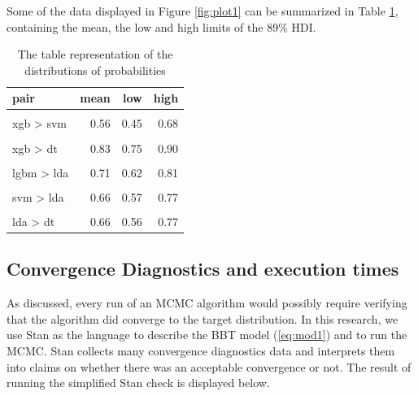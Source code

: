 \documentclass[twoside,11pt,preprint]{article}
\begin{document}
Some of the data displayed in Figure \ref{fig:plot1} can be summarized in Table \ref{tab:main1}, containing the mean, the low and high limits of the 89\% HDI.

\begin{table}

\caption{\label{tab:xresume1}\label{tab:main1}The table representation of the distributions of probabilities}
\centering
\begin{tabular}[t]{lrrr}
\toprule
\textbf{pair} & \textbf{mean} & \textbf{low} & \textbf{high}\\
\midrule
\cellcolor{gray!6}{xgb > lgbm} & \cellcolor{gray!6}{0.51} & \cellcolor{gray!6}{0.40} & \cellcolor{gray!6}{0.63}\\
xgb > svm & 0.56 & 0.45 & 0.68\\
\cellcolor{gray!6}{xgb > lda} & \cellcolor{gray!6}{0.72} & \cellcolor{gray!6}{0.62} & \cellcolor{gray!6}{0.81}\\
xgb > dt & 0.83 & 0.75 & 0.90\\
\cellcolor{gray!6}{lgbm > svm} & \cellcolor{gray!6}{0.55} & \cellcolor{gray!6}{0.44} & \cellcolor{gray!6}{0.66}\\
\addlinespace
lgbm > lda & 0.71 & 0.62 & 0.81\\
\cellcolor{gray!6}{lgbm > dt} & \cellcolor{gray!6}{0.82} & \cellcolor{gray!6}{0.75} & \cellcolor{gray!6}{0.90}\\
svm > lda & 0.66 & 0.57 & 0.77\\
\cellcolor{gray!6}{svm > dt} & \cellcolor{gray!6}{0.79} & \cellcolor{gray!6}{0.72} & \cellcolor{gray!6}{0.88}\\
lda > dt & 0.66 & 0.56 & 0.77\\
\bottomrule
\end{tabular}
\end{table}

\hypertarget{convergence-diagnostics-and-execution-times}{%
\subsection{\texorpdfstring{Convergence Diagnostics and execution times \label{sec:conv1}}{Convergence Diagnostics and execution times }}\label{convergence-diagnostics-and-execution-times}}

As discussed, every run of an MCMC algorithm would possibly require
verifying that the algorithm did converge to the target distribution.
In this research, we use Stan \citep{stan229} as the language to describe
the BBT model (\ref{eq:mod1}) and to run the MCMC. Stan collects many
convergence diagnostics data and interprets them into claims on
whether there was an acceptable convergence or not. The result of
running the simplified Stan check is displayed below.
\end{document}
